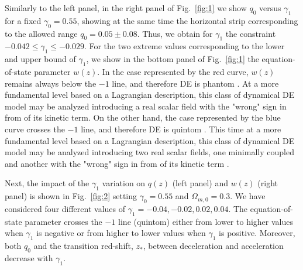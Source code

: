 \documentclass[aps,prd,amsmath,amssymb]{revtex4}
\begin{document}
Similarly to the left panel, in the right panel of Fig.~\ref{fig:1} we show $q_0$ versus $\gamma_1$ for a fixed 
$\gamma_0=0.55$, showing at the same time the horizontal strip corresponding to the allowed range $q_0=0.05 \pm 0.08$. 
Thus, we obtain for $\gamma_1$ the constraint $-0.042 \leq \gamma_1 \leq -0.029$. For the two extreme values corresponding to the lower and upper bound of $\gamma_1$, we show in the bottom panel of Fig.~\ref{fig:1} the equation-of-state parameter
$w(z)$. In the case represented by the red curve, $w(z)$ remains always below the $-1$ line, and therefore DE is phantom \cite{DE2,DE3}. At a more fundamental level based on a Lagrangian description, this class of dynamical DE model may be analyzed introducing a real scalar field with the "wrong" sign in from of its kinetic term. On the other hand, the case represented by the blue curve crosses the $-1$ line, and therefore DE is quintom \cite{DE4,DE5}. This time at a more fundamental level based on a Lagrangian description, this class of dynamical DE model may be analyzed introducing two real scalar fields, one minimally coupled and another with the "wrong" sign in from of its kinetic term \cite{saridakis1,saridakis2}.

\smallskip

Next, the impact of the $\gamma_1$ variation on $q(z)$ (left panel) and $w(z)$ (right panel) is shown in Fig.~\ref{fig:2} setting $\gamma_0=0.55$ and $\Omega_{m,0}=0.3$. We have considered four different values of 
$\gamma_1=-0.04,-0.02,0.02,0.04$. The equation-of-state parameter crosses the $-1$ line (quintom) either from lower to higher values when $\gamma_1$ is negative or from higher to lower values when $\gamma_1$ is positive. Moreover, both $q_0$
and the transition red-shift, $z_*$, between deceleration and acceleration decrease with $\gamma_1$.

\smallskip
\end{document}
